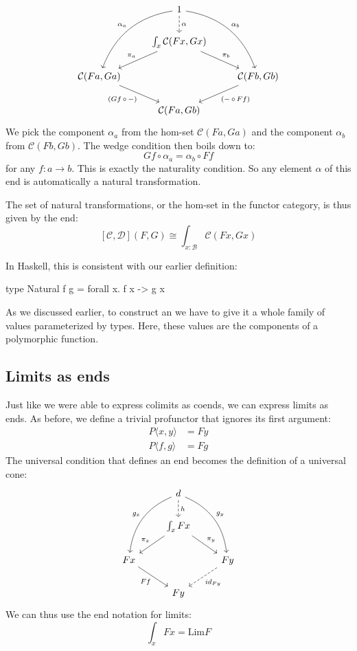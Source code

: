 \documentclass[DaoFP]{subfiles}
\begin{document}
\[
 \begin{tikzcd}
 & 1
 \arrow[d, dashed, "\alpha"]
\arrow[ddl, bend right, "\alpha_a"']
 \arrow[ddr, bend left, "\alpha_b"]
 \\
 & \int_{x} \mathcal{C}(F x, G x)
 \arrow[ld, "\pi_a"']
 \arrow[rd, "\pi_b"]
 \\
  \mathcal{C} ( F a, G a )
 \arrow[dr, "{(G f \, \circ \, -)}"']
 && \mathcal{C} ( F b, G b )
 \arrow[dl, "{(- \, \circ\, F f)}"]
 \\
 &  \mathcal{C} ( F a, G b )
 \end{tikzcd}
\]
We pick the component $\alpha_a$ from the hom-set $\mathcal{C} ( F a, G a )$ and the component $\alpha_b$ from $\mathcal{C} ( F b, G b )$. The wedge condition then boils down to:
\[ G f \circ \alpha_a = \alpha_b \circ F f \]
for any $f \colon a \to b$. This is exactly the naturality condition. So any element $\alpha$ of this end is automatically a natural transformation.

The set of natural transformations, or the hom-set in the functor category, is thus given by the end:
\[ [\mathcal{C}, \mathcal{D}] (F, G) \cong \int_{x \colon  \mathcal{B}} \mathcal{C}(F x, G x)\]

In Haskell, this is consistent with our earlier definition:
\begin{haskell}
type Natural f g = forall x. f x -> g x
\end{haskell}

As we discussed earlier, to construct an  we have to give it a whole family of values parameterized by types. Here, these values are the components of a polymorphic function. 

\subsection{Limits as ends}
Just like we were able to express colimits as coends, we can express limits as ends. As before, we define a trivial profunctor that ignores its first argument:
\begin{align*}
 P \langle x, y \rangle &= F y \\
 P \langle f, g \rangle &= F g 
\end{align*}
The universal condition that defines an end becomes the definition of a universal cone:
\[
 \begin{tikzcd}
 &d
 \arrow[ddl, bend right, "g_x"']
 \arrow[ddr, bend left, "g_y"]
 \arrow[d, dashed, "h"]
 \\
 & \int_x F x
 \arrow[ld, "\pi_x"']
 \arrow[rd, "\pi_y"]
 \\
 F x
 \arrow[dr, "F f"']
 &&F y
 \arrow[dl, dashed, "id_{F y}"]
 \\
 & F y
 \end{tikzcd}
\]
We can thus use the end notation for limits:
\[ \int_x F x = \text{Lim} F \]
\end{document}
